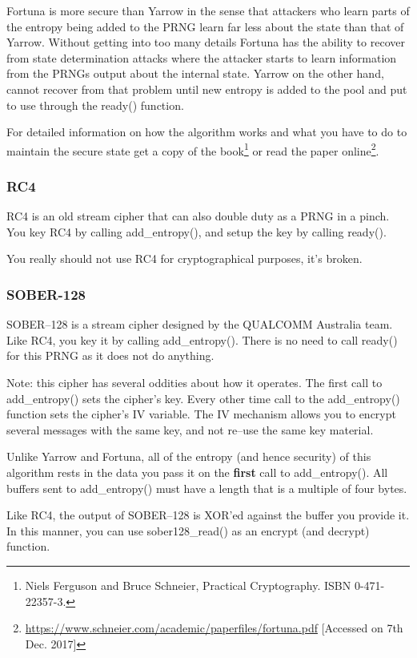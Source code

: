 \documentclass[synpaper]{book}
\begin{document}
Fortuna is more secure than Yarrow in the sense that attackers who learn parts of the entropy being
added to the PRNG learn far less about the state than that of Yarrow.  Without getting into too many
details Fortuna has the ability to recover from state determination attacks where the attacker starts
to learn information from the PRNGs output about the internal state.  Yarrow on the other hand, cannot
recover from that problem until new entropy is added to the pool and put to use through the ready() function.

For detailed information on how the algorithm works and what you have to do to maintain the secure state
get a copy of the book\footnote{Niels Ferguson and Bruce Schneier, Practical Cryptography. ISBN 0-471-22357-3.} or
read the paper online\footnote{\url{https://www.schneier.com/academic/paperfiles/fortuna.pdf} [Accessed on 7th Dec. 2017]}.

\subsubsection{RC4}

RC4 is an old stream cipher that can also double duty as a PRNG in a pinch.  You key RC4 by
calling add\_entropy(), and setup the key by calling ready().

You really should not use RC4 for cryptographical purposes, it's broken.

\subsubsection{SOBER-128}

SOBER--128 is a stream cipher designed by the QUALCOMM Australia team.  Like RC4, you key it by
calling add\_entropy().  There is no need to call ready() for this PRNG as it does not do anything.

Note: this cipher has several oddities about how it operates.  The first call to add\_entropy() sets the cipher's key.
Every other time call to the add\_entropy() function sets the cipher's IV variable.  The IV mechanism allows you to
encrypt several messages with the same key, and not re--use the same key material.

Unlike Yarrow and Fortuna, all of the entropy (and hence security) of this algorithm rests in the data
you pass it on the \textbf{first} call to add\_entropy().  All buffers sent to add\_entropy() must have a length
that is a multiple of four bytes.

Like RC4, the output of SOBER--128 is XOR'ed against the buffer you provide it.  In this manner, you can use
sober128\_read() as an encrypt (and decrypt) function.
\end{document}
